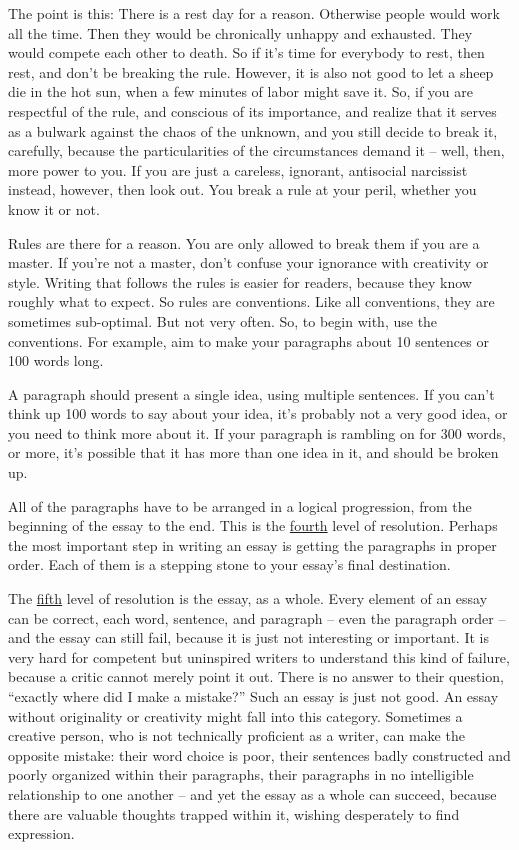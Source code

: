 \documentclass{article}
\begin{document}
The point is this: There is a rest day for a reason. Otherwise people
would work all the time. Then they would be chronically unhappy and
exhausted. They would compete each other to death. So if it's time for
everybody to rest, then rest, and don't be breaking the rule. However,
it is also not good to let a sheep die in the hot sun, when a few
minutes of labor might save it. So, if you are respectful of the rule,
and conscious of its importance, and realize that it serves as a bulwark
against the chaos of the unknown, and you still decide to break it,
carefully, because the particularities of the circumstances demand it --
well, then, more power to you. If you are just a careless, ignorant,
antisocial narcissist instead, however, then look out. You break a rule
at your peril, whether you know it or not.

Rules are there for a reason. You are only allowed to break them if you
are a master. If you're not a master, don't confuse your ignorance with
creativity or style. Writing that follows the rules is easier for
readers, because they know roughly what to expect. So rules are
conventions. Like all conventions, they are sometimes sub-optimal. But
not very often. So, to begin with, use the conventions. For example, aim
to make your paragraphs about 10 sentences or 100 words long.

A paragraph should present a single idea, using multiple sentences. If
you can't think up 100 words to say about your idea, it's probably not a
very good idea, or you need to think more about it. If your paragraph is
rambling on for 300 words, or more, it's possible that it has more than
one idea in it, and should be broken up.

All of the paragraphs have to be arranged in a logical progression, from
the beginning of the essay to the end. This is the \ul{fourth} level of
resolution. Perhaps the most important step in writing an essay is
getting the paragraphs in proper order. Each of them is a stepping stone
to your essay's final destination.

The \ul{fifth} level of resolution is the essay, as a whole. Every
element of an essay can be correct, each word, sentence, and paragraph
-- even the paragraph order -- and the essay can still fail, because it
is just not interesting or important. It is very hard for competent but
uninspired writers to understand this kind of failure, because a critic
cannot merely point it out. There is no answer to their question,
``exactly where did I make a mistake?'' Such an essay is just not good.
An essay without originality or creativity might fall into this
category. Sometimes a creative person, who is not technically proficient
as a writer, can make the opposite mistake: their word choice is poor,
their sentences badly constructed and poorly organized within their
paragraphs, their paragraphs in no intelligible relationship to one
another -- and yet the essay as a whole can succeed, because there are
valuable thoughts trapped within it, wishing desperately to find
expression.
\end{document}
